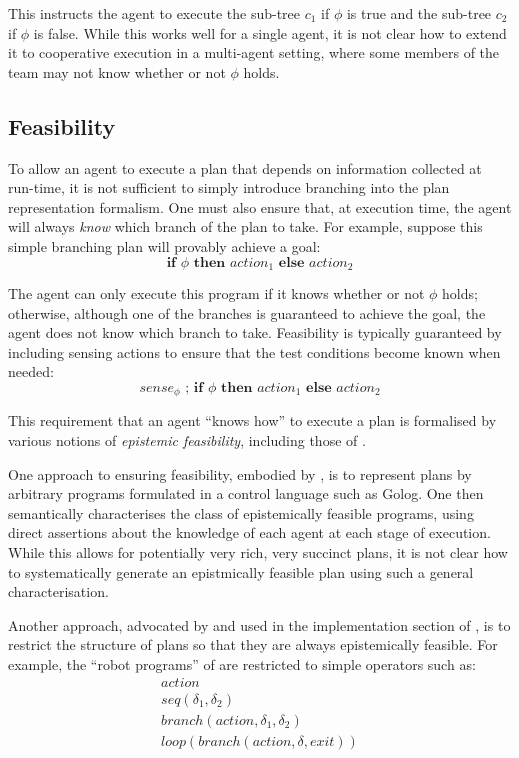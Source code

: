 This instructs the agent to execute the sub-tree $c_{1}$ if $\phi$
is true and the sub-tree $c_{2}$ if $\phi$ is false. While this
works well for a single agent, it is not clear how to extend it to
cooperative execution in a multi-agent setting, where some members
of the team may not know whether or not $\phi$ holds.


\subsection{Feasibility\label{sec:JointExec:BG:Feasibility}}

To allow an agent to execute a plan that depends on information collected
at run-time, it is not sufficient to simply introduce branching into
the plan representation formalism. One must also ensure that, at execution
time, the agent will always \emph{know} which branch of the plan to
take. For example, suppose this simple branching plan will provably
achieve a goal:\[
\mathbf{if}\,\,\phi\,\,\mathbf{then}\,\, action_{1}\,\,\mathbf{else\,}\, action_{2}\]


The agent can only execute this program if it knows whether or not
$\phi$ holds; otherwise, although one of the branches is guaranteed
to achieve the goal, the agent does not know which branch to take.
Feasibility is typically guaranteed by including sensing actions to
ensure that the test conditions become known when needed:\[
sense_{\phi}\,\,;\,\mathbf{if\,}\,\phi\,\,\mathbf{then}\,\, action_{1}\,\,\mathbf{else\,}\, action_{2}\]


This requirement that an agent {}``knows how'' to execute a plan
is formalised by various notions of \emph{epistemic feasibility},
including those of \citep{levesque98what_robots_can_do,levesque00knowing_how,Lesperance01epi_feas_casl,giacomo04sem_delib_indigolog,baier06programs_that_sense}.

One approach to ensuring feasibility, embodied by \citep{levesque00knowing_how,giacomo04sem_delib_indigolog,baier06programs_that_sense},
is to represent plans by arbitrary programs formulated in a control
language such as Golog. One then semantically characterises the class
of epistemically feasible programs, using direct assertions about
the knowledge of each agent at each stage of execution. While this
allows for potentially very rich, very succinct plans, it is not clear
how to systematically generate an epistmically feasible plan using
such a general characterisation.

Another approach, advocated by \citep{levesque96what_is_planning,levesque98what_robots_can_do}
and used in the implementation section of \citep{giacomo04sem_delib_indigolog},
is to restrict the structure of plans so that they are always epistemically
feasible. For example, the {}``robot programs'' of \citep{levesque98what_robots_can_do}
are restricted to simple operators such as:\begin{gather*}
action\\
seq(\delta_{1},\delta_{2})\\
branch(action,\delta_{1},\delta_{2})\\
loop(branch(action,\delta,exit))\end{gather*}


